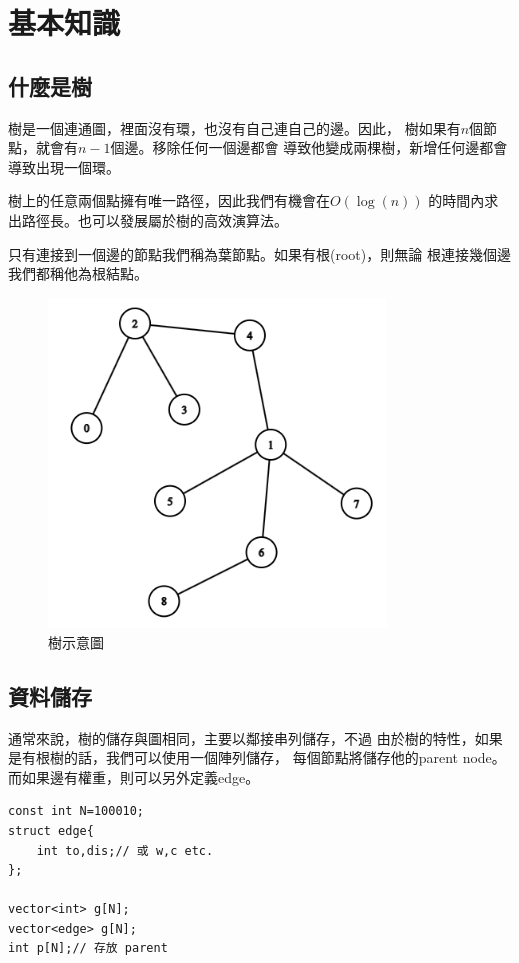 \section{基本知識}
    \subsection{什麼是樹}
    樹是一個連通圖，裡面沒有環，也沒有自己連自己的邊。因此，
    樹如果有$n$個節點，就會有$n-1$個邊。移除任何一個邊都會
    導致他變成兩棵樹，新增任何邊都會導致出現一個環。

    樹上的任意兩個點擁有唯一路徑，因此我們有機會在$O(\log{(n)})$
    的時間內求出路徑長。也可以發展屬於樹的高效演算法。

    只有連接到一個邊的節點我們稱為葉節點。如果有根(root)，則無論
    根連接幾個邊我們都稱他為根結點。

    \begin{figure}[h]
        \centering
        \includegraphics[width=0.8\textwidth]{../Images/Tree.png}
        \caption{樹示意圖}
    \end{figure}

    \subsection{資料儲存}
    通常來說，樹的儲存與圖相同，主要以鄰接串列儲存，不過
    由於樹的特性，如果是有根樹的話，我們可以使用一個陣列儲存，
    每個節點將儲存他的parent node。而如果邊有權重，則可以另外定義edge。

\begin{lstlisting}[caption=樹的儲存]
const int N=100010;
struct edge{
    int to,dis;// 或 w,c etc.
};

vector<int> g[N];
vector<edge> g[N];
int p[N];// 存放 parent
\end{lstlisting}


